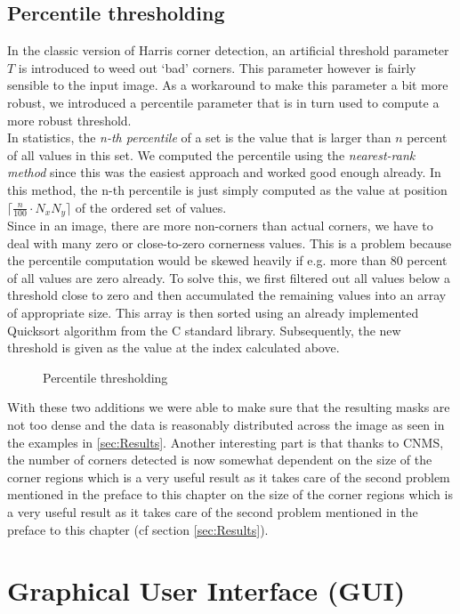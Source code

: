 \subsection{Percentile thresholding}\label{sub:Percentile}
In the classic version of Harris corner detection, an artificial threshold parameter $T$ is
introduced to weed out `bad' corners. This parameter however is fairly sensible to the input image.
 As a workaround to make this parameter a bit more robust, we introduced a percentile
parameter that is in turn used to compute a more robust threshold.\\
In statistics, the \textit{n-th percentile} of a set is the value that is larger than $n$ percent
of all values in this set.
We computed the percentile using the \textit{nearest-rank method} since this was the easiest
approach and worked good enough already. In this method, the n-th percentile is just simply
computed as the value at position $\lceil \frac{n}{100}\cdot N_xN_y\rceil$ of the ordered set of values.\\
Since in an image, there are more non-corners than actual corners, we have to deal with many zero
or close-to-zero cornerness values. This is a problem because the percentile computation would be skewed
heavily if e.g. more than 80 percent of all values are zero already. To solve this, we first filtered
out all values below a threshold close to zero and then accumulated the remaining values into an
array of appropriate size. This array is then sorted using an already implemented Quicksort
algorithm from the C standard library. Subsequently, the new threshold is given as the value at
the index calculated above.\\
\begin{figure}[ht]
    
    \caption{Percentile thresholding}
\end{figure}

With these two additions we were able to make sure that the resulting masks are not too dense and
the data is reasonably distributed across the image as seen in the examples in \ref{sec:Results}.
Another interesting part is that thanks to CNMS, the number of corners detected is now somewhat
dependent on the size of the corner regions which is a very useful result as it takes care of the
second problem mentioned in the preface to this chapter on the size of the corner regions which is
a very useful result as it takes care of the second problem mentioned in the preface to this
chapter (cf section \ref{sec:Results}).
\section{Graphical User Interface (GUI)}
